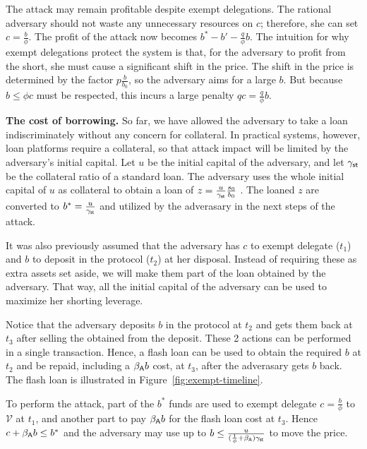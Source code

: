 The attack may remain profitable despite exempt delegations.
The rational adversary should not waste any unnecessary resources on
$c$; therefore, she can set $c = \frac{b}{\phi}$. The profit of the attack now
becomes $b^* - b' - \frac{q}{\phi}b$.
The intuition for why exempt delegations protect the system is that,
for the adversary to profit from the short, she must cause a significant
shift in the price. The shift in the price is determined by the factor
$p\frac{b}{b_0}$, so the adversary aims for a large $b$. But because $b \leq \phi c$
must be respected, this incurs a large penalty $qc = \frac{q}{\phi}b$.

\noindent
\textbf{The cost of borrowing.}
So far, we have allowed the adversary to take a loan indiscriminately without
any concern for collateral. In practical systems, however, loan platforms
require a collateral, so that attack impact will be limited by the adversary's
initial capital. Let $u$ \asset be the initial capital of the adversary, and
let $\gamma_{\textsf{st}}$ be the collateral ratio of a standard \stasset
loan. The adversary uses the whole initial capital of $u$ \asset as
collateral to obtain a loan of $z = \frac{u}{\gamma_{\textsf{st}}} \frac{s_0}{b_0}$ \stasset.
The loaned $z$ \stasset are converted to $b^*=\frac{u}{\gamma_{\textsf{st}}}$ \asset
and utilized by the adverasary in the next steps of the attack.

It was also previously assumed that the adversary has $c$ \asset to exempt
delegate ($t_1$) and $b$ \asset to deposit in the protocol ($t_2$) at her disposal.
Instead of requiring these as extra assets set aside, we will make them part of
the loan obtained by the adversary. That way, all the initial capital of
the adversary can be used to maximize her shorting leverage.

Notice that the adversary deposits $b$ \asset in the protocol at $t_2$ and
gets them back at $t_3$ after selling the \stasset obtained from the deposit.
These 2 actions can be performed in a single transaction. Hence, a flash
loan can be used to obtain the required $b$ \asset at $t_2$ and be repaid,
including a $\beta_{\textsf{A}} b$ \asset cost, at $t_3$, after the adverasary gets
$b$ \asset back.
The flash loan is illustrated in Figure~\ref{fig:exempt-timeline}.

To perform the attack, part of the $b^*$ funds are used to exempt delegate
$c = \frac{b}{\phi}$ \asset to $\mathcal{V}$ at $t_1$, and another part
to pay $\beta_{\textsf{A}} b$ \asset for the flash loan cost at $t_3$.
Hence $c + \beta_{\textsf{A}} b \leq b^*$ and the adversary may use up to
$b \leq \frac{u}{(\frac{1}{\phi} + \beta_{\textsf{A}})\gamma_{\textsf{st}}}$
to move the price.

